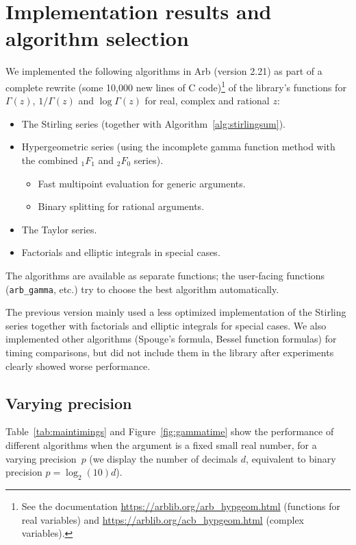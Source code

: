 \documentclass[reqno]{amsart}
\theoremstyle{definition}
\begin{document}

\section{Implementation results and algorithm selection}

\label{sect:implresults}

We implemented the following algorithms in Arb (version 2.21)
as part of a complete rewrite (some 10,000 new lines of C code)\footnote{See the documentation \url{https://arblib.org/arb_hypgeom.html} (functions for real variables) and \url{https://arblib.org/acb_hypgeom.html} (complex variables).}
of the library's functions for
$\Gamma(z)$, $1/\Gamma(z)$ and $\log \Gamma(z)$
for real, complex and rational $z$:

\begin{itemize}
\item The Stirling series (together with Algorithm~\ref{alg:stirlingsum}).
\item Hypergeometric series (using the incomplete gamma function method with the combined ${}_1F_1$ and ${}_2F_0$ series).
\begin{itemize}
\item Fast multipoint evaluation for generic arguments.
\item Binary splitting for rational arguments.
\end{itemize}
\item The Taylor series.
\item Factorials and elliptic integrals in special cases.
\end{itemize}

The algorithms are available as separate
functions; the user-facing functions (\texttt{arb\_gamma}, etc.)
try to choose the best algorithm automatically.

The previous version mainly used a less optimized
implementation of the Stirling series
together with factorials and elliptic integrals for special cases.
We also implemented other algorithms (Spouge's formula, Bessel function formulas) for
timing comparisons, but did not include them in the library
after experiments clearly showed worse performance.

\subsection{Varying precision}

Table~\ref{tab:maintimings} and Figure~\ref{fig:gammatime} show
the performance of different algorithms
when the argument is a fixed small real number,
for a varying precision~$p$ (we display the number of decimals $d$, equivalent to binary precision $p = \log_2(10) d$).
\end{document}
